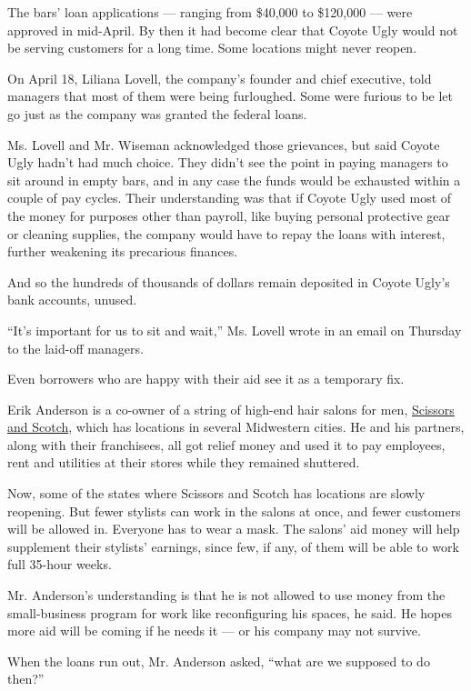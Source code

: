The bars' loan applications --- ranging from \$40,000 to \$120,000 ---
were approved in mid-April. By then it had become clear that Coyote Ugly
would not be serving customers for a long time. Some locations might
never reopen.

On April 18, Liliana Lovell, the company's founder and chief executive,
told managers that most of them were being furloughed. Some were furious
to be let go just as the company was granted the federal loans.

Ms. Lovell and Mr. Wiseman acknowledged those grievances, but said
Coyote Ugly hadn't had much choice. They didn't see the point in paying
managers to sit around in empty bars, and in any case the funds would be
exhausted within a couple of pay cycles. Their understanding was that if
Coyote Ugly used most of the money for purposes other than payroll, like
buying personal protective gear or cleaning supplies, the company would
have to repay the loans with interest, further weakening its precarious
finances.

And so the hundreds of thousands of dollars remain deposited in Coyote
Ugly's bank accounts, unused.

``It's important for us to sit and wait,'' Ms. Lovell wrote in an email
on Thursday to the laid-off managers.

Even borrowers who are happy with their aid see it as a temporary fix.

Erik Anderson is a co-owner of a string of high-end hair salons for men,
\href{https://www.scissorsscotch.com/\#scissors-scotch}{Scissors and
Scotch}, which has locations in several Midwestern cities. He and his
partners, along with their franchisees, all got relief money and used it
to pay employees, rent and utilities at their stores while they remained
shuttered.

Now, some of the states where Scissors and Scotch has locations are
slowly reopening. But fewer stylists can work in the salons at once, and
fewer customers will be allowed in. Everyone has to wear a mask. The
salons' aid money will help supplement their stylists' earnings, since
few, if any, of them will be able to work full 35-hour weeks.

Mr. Anderson's understanding is that he is not allowed to use money from
the small-business program for work like reconfiguring his spaces, he
said. He hopes more aid will be coming if he needs it --- or his company
may not survive.

When the loans run out, Mr. Anderson asked, ``what are we supposed to do
then?''

